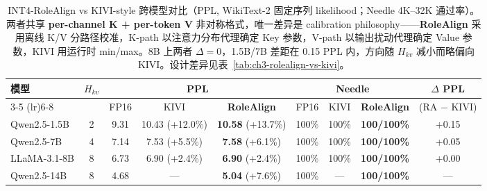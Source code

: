 \begin{table}[!htbp]
  \centering
  \small
  \setlength{\tabcolsep}{4.5pt}
  \begin{tabular}{l c ccc ccc c}
    \toprule
    \multirow{2}{*}{\textbf{模型}} & \multirow{2}{*}{$H_{kv}$} & \multicolumn{3}{c}{\textbf{PPL}} & \multicolumn{3}{c}{\textbf{Needle}} & \multirow{2}{*}{$\Delta$ PPL} \\
    \cmidrule(lr){3-5} \cmidrule(lr){6-8}
    & & FP16 & KIVI & \textbf{RoleAlign} & FP16 & KIVI & \textbf{RoleAlign} & (RA $-$ KIVI) \\
    \midrule
    Qwen2.5-1.5B & 2 & 9.31 & 10.43 \scriptsize{(+12.0\%)} & \textbf{10.58} \scriptsize{(+13.7\%)} & 100\% & 100\% & \textbf{100/100\%} & +0.15 \\
    Qwen2.5-7B & 4 & 7.14 & 7.53 \scriptsize{(+5.5\%)} & \textbf{7.58} \scriptsize{(+6.1\%)} & 100\% & 100\% & \textbf{100/100\%} & +0.05 \\
    LLaMA-3.1-8B & 8 & 6.73 & 6.90 \scriptsize{(+2.4\%)} & \textbf{6.90} \scriptsize{(+2.4\%)} & 100\% & 100\% & \textbf{100/100\%} & +0.00 \\
    Qwen2.5-14B & 8 & 4.68 & --- & \textbf{5.04} \scriptsize{(+7.6\%)} & 100\% & --- & \textbf{100/100\%} & --- \\
    \bottomrule
  \end{tabular}
  \caption{INT4-RoleAlign vs KIVI-style 跨模型对比（PPL, WikiText-2 固定序列 likelihood；Needle 4K--32K 通过率）。两者共享 \textbf{per-channel K + per-token V} 非对称格式，唯一差异是 calibration philosophy——\textbf{RoleAlign} 采用离线 K/V 分路径校准，K-path 以注意力分布代理确定 Key 参数，V-path 以输出扰动代理确定 Value 参数，KIVI 用运行时 min/max。8B 上两者 $\Delta{=}0$，1.5B/7B 差距在 0.15 PPL 内，方向随 $H_{kv}$ 减小而略偏向 KIVI。设计差异见表~\ref{tab:ch3-rolealign-vs-kivi}。}
  \label{tab:t2-int4-kivi}
  \par\smallskip{}
\end{table}
